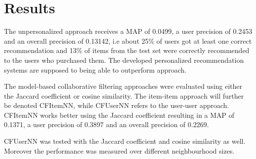 \documentclass[10pt]{reportMaster}
\begin{document}
\section{Results}
The unpersonalized approach receives a MAP of 0.0499, a user precision of 0.2453 and an overall precision of 0.13142, i.e about 25\% of users got at least one correct recommendation and 13\% of items from the test set were correctly recommended to the users who purchased them.
The developed personalized recommendation systems are supposed to being able to outperform approach.

The model-based collaborative filtering approaches were evaluated using either the Jaccard coefficient or cosine similarity.
The item-item approach will further be denoted CFItemNN, while CFUserNN refers to the user-user approach.
CFItemNN works better using the Jaccard coefficient resulting in a MAP of 0.1371, a user precision of 0.3897 and an overall precision of 0.2269.

CFUserNN was tested with the Jaccard coefficient and cosine similarity as well.
Moreover the performance was measured over different neighbourhood sizes.





	



\end{document}
